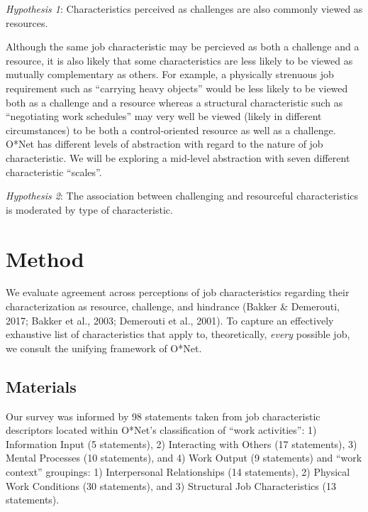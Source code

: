 \documentclass[
  man]{apa6}
\begin{document}
\emph{Hypothesis 1}: Characteristics perceived as challenges are also commonly viewed as resources.

Although the same job characteristic may be percieved as both a challenge and a resource, it is also likely that some characteristics are less likely to be viewed as mutually complementary as others. For example, a physically strenuous job requirement such as ``carrying heavy objects'' would be less likely to be viewed both as a challenge and a resource whereas a structural characteristic such as ``negotiating work schedules'' may very well be viewed (likely in different circumstances) to be both a control-oriented resource as well as a challenge. O*Net has different levels of abstraction with regard to the nature of job characteristic. We will be exploring a mid-level abstraction with seven different characteristic ``scales''.

\emph{Hypothesis 2}: The association between challenging and resourceful characteristics is moderated by type of characteristic.

\hypertarget{method}{%
\section{Method}\label{method}}

We evaluate agreement across perceptions of job characteristics regarding their characterization as resource, challenge, and hindrance (Bakker \& Demerouti, 2017; Bakker et al., 2003; Demerouti et al., 2001). To capture an effectively exhaustive list of characteristics that apply to, theoretically, \emph{every} possible job, we consult the unifying framework of O*Net.

\hypertarget{materials}{%
\subsection{Materials}\label{materials}}

Our survey was informed by 98 statements taken from job characteristic descriptors located within O*Net's classification of ``work activities'': 1) Information Input (5 statements), 2) Interacting with Others (17 statements), 3) Mental Processes (10 statements), and 4) Work Output (9 statements) and ``work context'' groupings: 1) Interpersonal Relationships (14 statements), 2) Physical Work Conditions (30 statements), and 3) Structural Job Characteristics (13 statements).
\end{document}
